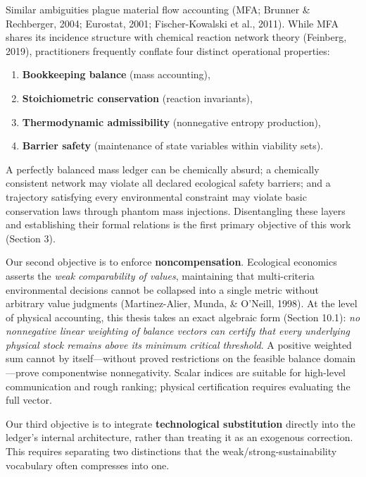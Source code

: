 \documentclass[11pt]{article}
\begin{document}
Similar ambiguities plague material flow accounting (MFA; Brunner \& Rechberger, 2004; Eurostat, 2001; Fischer-Kowalski et al., 2011). While MFA shares its incidence structure with chemical reaction network theory (Feinberg, 2019), practitioners frequently conflate four distinct operational properties:

\begin{enumerate}\setlength{\itemsep}{2pt}
\item \textbf{Bookkeeping balance} (mass accounting),
\item \textbf{Stoichiometric conservation} (reaction invariants),
\item \textbf{Thermodynamic admissibility} (nonnegative entropy production),
\item \textbf{Barrier safety} (maintenance of state variables within viability sets).
\end{enumerate}

A perfectly balanced mass ledger can be chemically absurd; a chemically consistent network may violate all declared ecological safety barriers; and a trajectory satisfying every environmental constraint may violate basic conservation laws through phantom mass injections. Disentangling these layers and establishing their formal relations is the first primary objective of this work (Section 3).

Our second objective is to enforce \textbf{noncompensation}. Ecological economics asserts the \emph{weak comparability of values}, maintaining that multi-criteria environmental decisions cannot be collapsed into a single metric without arbitrary value judgments (Martinez-Alier, Munda, \& O'Neill, 1998). At the level of physical accounting, this thesis takes an exact algebraic form (Section 10.1): \emph{no nonnegative linear weighting of balance vectors can certify that every underlying physical stock remains above its minimum critical threshold}. A positive weighted sum cannot by itself---without proved restrictions on the feasible balance domain---prove componentwise nonnegativity. Scalar indices are suitable for high-level communication and rough ranking; physical certification requires evaluating the full vector.

Our third objective is to integrate \textbf{technological substitution} directly into the ledger's internal architecture, rather than treating it as an exogenous correction. This requires separating two distinctions that the weak/strong-sustainability vocabulary often compresses into one.
\end{document}
